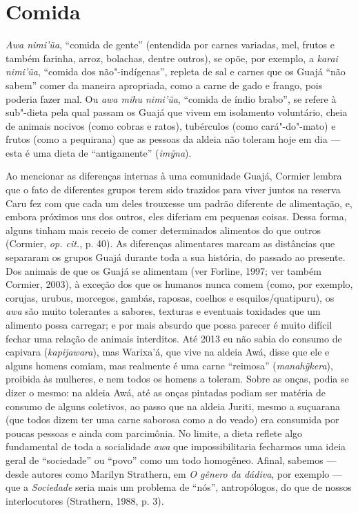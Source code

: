 \section{Comida}\label{comida}

\emph{Awa nimi'ũa}, ``comida de gente'' (entendida por carnes variadas,
mel, frutos e também farinha, arroz, bolachas, dentre outros), se opõe,
por exemplo, a \emph{karai nimi'ũa}, ``comida dos não"-indígenas'', repleta
de sal e carnes que os Guajá ``não sabem'' comer da maneira apropriada,
como a carne de gado e frango, pois poderia fazer mal. Ou \emph{awa mihu
nimi'ũa}, ``comida de índio brabo'', se refere à sub"-dieta pela qual
passam os Guajá que vivem em isolamento voluntário, cheia de animais
nocivos (como cobras e ratos), tubérculos (como cará"-do"-mato) e frutos
(como a pequirana) que as pessoas da aldeia não toleram hoje em dia ---
esta é uma dieta de ``antigamente'' (\emph{imỹna}).

Ao mencionar as diferenças internas à uma comunidade Guajá, Cormier
lembra que o fato de diferentes grupos terem sido trazidos para viver
juntos na reserva Caru fez com que cada um deles trouxesse um padrão
diferente de alimentação, e, embora próximos uns dos outros, eles
diferiam em pequenas coisas. Dessa forma, alguns tinham mais receio de
comer determinados alimentos do que outros (Cormier, \emph{op. cit.}, p. 40).
As diferenças alimentares marcam as distâncias que separaram os grupos
Guajá durante toda a sua história, do passado ao presente. Dos animais
de que os Guajá se alimentam (ver Forline, 1997; ver também Cormier,
2003), à exceção dos que os humanos nunca comem (como, por exemplo,
corujas, urubus, morcegos, gambás, raposas, coelhos e
esquilos/quatipuru), os \emph{awa} são muito tolerantes a sabores,
texturas e eventuais toxidades que um alimento possa carregar; e por
mais absurdo que possa parecer é muito difícil fechar uma relação de
animais interditos. Até 2013 eu não sabia do consumo de capivara
(\emph{kapijawara}), mas Warixa'á, que vive na aldeia Awá, disse que ele
e alguns homens comiam, mas realmente é uma carne ``reimosa''
(\emph{manahỹkera}), proibida às mulheres, e nem todos os homens a
toleram. Sobre as onças, podia se dizer o mesmo: na aldeia Awá, até as
onças pintadas podiam ser matéria de consumo de alguns coletivos, ao
passo que na aldeia Juriti, mesmo a suçuarana (que todos dizem ter uma
carne saborosa como a do veado) era consumida por poucas pessoas e ainda
com parcimônia. No limite, a dieta reflete algo fundamental de toda a
socialidade \emph{awa} que impossibilitaria fecharmos uma ideia geral de
``sociedade'' ou ``povo'' como um todo homogêneo. Afinal, sabemos ---
desde autores como Marilyn Strathern, em \emph{O gênero da dádiva}, por
exemplo --- que a \emph{Sociedade} seria mais um problema de ``nós'',
antropólogos, do que de nossos interlocutores (Strathern, 1988, p. 3).

